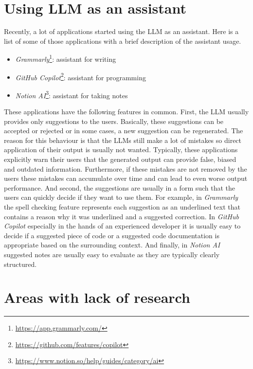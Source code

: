 \section*{Using LLM as an assistant}
\label{section:llm_as_an_assistant}

Recently, a lot of applications started using the LLM as an assistant. Here is a list of some of those applications with a brief description of the assistant usage.

\begin{itemize}
\item \textit{Grammarly}\footnote{\url{https://app.grammarly.com/}}: assistant for writing
\item \textit{GitHub Copilot}\footnote{\url{https://github.com/features/copilot}}: assistant for programming
\item \textit{Notion AI}\footnote{\url{https://www.notion.so/help/guides/category/ai}}: assistant for taking notes
\end{itemize}

These applications have the following features in common. First, the LLM usually provides only suggestions to the users. Basically, these suggestions can be accepted or rejected or in some cases, a new suggestion can be regenerated. The reason for this behaviour is that the LLMs still make a lot of mistakes so direct application of their output is usually not wanted. Typically, these applications explicitly warn their users that the generated output can provide false, biased and outdated information. Furthermore, if these mistakes are not removed by the users these mistakes can accumulate over time and can lead to even worse output performance. And second, the suggestions are usually in a form such that the users can quickly decide if they want to use them. For example, in \textit{Grammarly} the spell checking feature represents each suggestion as an underlined text that contains a reason why it was underlined and a suggested correction. In \textit{GitHub Copilot} especially in the hands of an experienced developer it is usually easy to decide if a suggested piece of code or a suggested code documentation is appropriate based on the surrounding context. And finally, in \textit{Notion AI} suggested notes are usually easy to evaluate as they are typically clearly structured.


\section*{Areas with lack of research}

